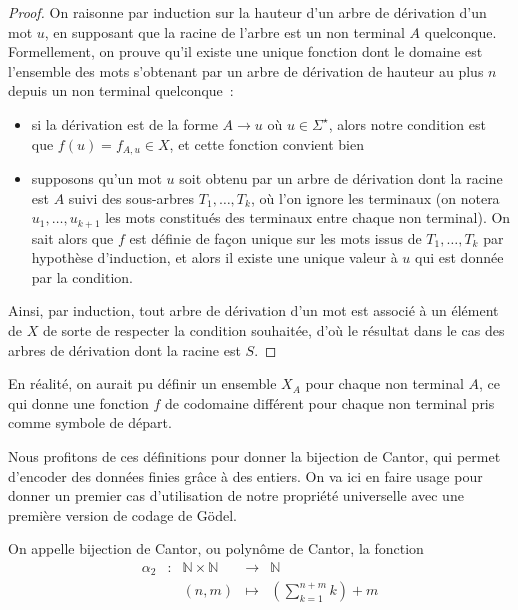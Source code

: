 \begin{proof}
  On raisonne par induction sur la hauteur d'un arbre de dérivation d'un mot
  $u$, en supposant que la racine de l'arbre est un non terminal $A$
  quelconque. Formellement, on prouve qu'il existe une unique fonction dont
  le domaine est l'ensemble des mots s'obtenant par un arbre de dérivation de
  hauteur au plus $n$ depuis un non terminal quelconque~:
  \begin{itemize}
  \item si la dérivation est de la forme $A \to u$ où $u\in\Sigma^\star$, alors
    notre condition est que $f(u) = f_{A,u} \in X$, et cette fonction convient
    bien
  \item supposons qu'un mot $u$ soit obtenu par un arbre de dérivation dont la
    racine est $A$ suivi des sous-arbres $T_1,\ldots,T_k$, où l'on ignore les
    terminaux (on notera $u_1,\ldots,u_{k+1}$ les mots constitués des terminaux
    entre chaque non terminal). On sait alors que $f$ est définie de façon
    unique sur les mots issus de $T_1,\ldots,T_k$ par hypothèse d'induction, et
    alors il existe une unique valeur à $u$ qui est donnée par la condition.
  \end{itemize}

  Ainsi, par induction, tout arbre de dérivation d'un mot est associé à un
  élément de $X$ de sorte de respecter la condition souhaitée, d'où le
  résultat dans le cas des arbres de dérivation dont la racine est $S$.
\end{proof}

\begin{remark}
  En réalité, on aurait pu définir un ensemble $X_A$ pour chaque non terminal
  $A$, ce qui donne une fonction $f$ de codomaine différent pour chaque
  non terminal pris comme symbole de départ.
\end{remark}

Nous profitons de ces définitions pour donner la bijection de Cantor, qui
permet d'encoder des données finies grâce à des entiers. On va ici en faire
usage pour donner un premier cas d'utilisation de notre propriété universelle
avec une première version de codage de Gödel.

\begin{definition}\label{def.bij.Cantor}
  On appelle bijection de Cantor, ou polynôme de Cantor, la fonction
  \[\begin{array}{ccccc}
  \alpha_2 & : & \mathbb N \times \mathbb N & \longrightarrow & \mathbb N\\
  & & (n,m) & \displaystyle\longmapsto &
  \displaystyle\left(\sum_{k = 1}^{n+m} k\right)+m
  \end{array}\]
\end{definition}

